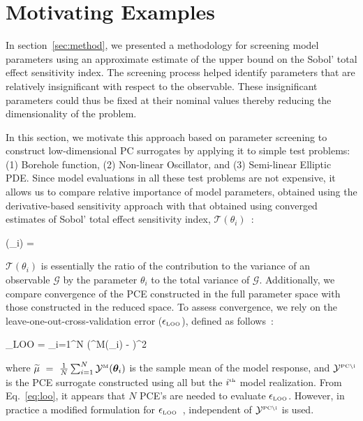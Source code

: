 \section{Motivating Examples}
\label{sec:examples}

In section~\ref{sec:method}, we presented a methodology for screening model
parameters using an approximate estimate of the upper bound on the Sobol'
total effect sensitivity index. The screening process helped identify parameters
that are relatively insignificant with respect to the observable. These insignificant
parameters could thus be fixed at their nominal values thereby reducing the
dimensionality of the problem. 

In this section, we motivate this approach based
on parameter screening to construct low-dimensional PC surrogates by 
applying it to simple test problems: (1) Borehole function, (2) Non-linear Oscillator, and
(3) Semi-linear Elliptic PDE. Since model evaluations in all these test
problems are not expensive, it allows us to compare relative importance of
model parameters,
obtained using the derivative-based sensitivity approach with that obtained
using converged estimates of Sobol' total effect sensitivity index, $\mathcal{T}(\theta_i)$~\cite{Sobol:2001}:

\be
{}(\theta_i) = 
\ee

\noindent $\mathcal{T}(\theta_i)$ is essentially the ratio of the contribution to the variance of an
observable $\mathcal{G}$ by the parameter $\theta_i$ to the total variance of $\mathcal{G}$.
Additionally, we compare convergence of the PCE constructed in
the full parameter space with those constructed in the reduced space. To assess convergence, 
we rely on the 
leave-one-out-cross-validation error ($\epsilon_{\mbox{\tiny LOO}}$), defined
as follows~\cite{Blatman:2010}:

\be
\epsilon_{\mbox{\tiny LOO}} = 
{\sum_{i=1}^N
\left(^{\mbox{\tiny M}}(\bm{\theta}_i) - \widetilde{\mu}\right)^2}
\label{eq:loo}
\ee

\noindent where $\widetilde{\mu}~=~\frac{1}{N}\sum_{i=1}^N \mathcal{Y}^{\mbox{\tiny M}}(\bm{\theta}_i)$
is the sample mean of the model response, and $ \mathcal{Y}^{\mbox{\tiny {PC}\textbackslash i}}$
is the PCE surrogate constructed using all but the $i^{\mbox{\tiny{th}}}$ model realization. 
From Eq.~\ref{eq:loo}, it appears that $N$ PCE's are needed to evaluate $\epsilon_{\mbox{\tiny LOO}}$.
However, in practice a modified formulation for $\epsilon_{\mbox{\tiny LOO}}$~\cite{Blatman:2009},
independent of $\mathcal{Y}^{\mbox{\tiny {PC}\textbackslash i}}$ is used.

